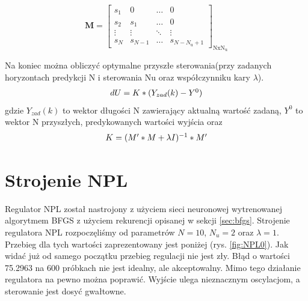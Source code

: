 		\begin{equation}
		\boldsymbol{M}=\left[
		\begin{array}
		{cccc}
		s_{1} & 0 & \ldots & 0\\
		s_{2} & s_{1} & \ldots & 0\\
		\vdots & \vdots & \ddots & \vdots\\
		s_{N} & s_{N-1} & \ldots &  s_{N-N_{\mathrm{u}}+1}
		\end{array}
		\right]_{\mathrm{NxN_u}}
		\label{Mm}
		\end{equation}
		
		Na koniec można obliczyć optymalne przyszłe sterowania(przy zadanych horyzontach predykcji N i sterowania Nu oraz współczynniku kary $\lambda$). 
		\begin{equation}
		\begin{tabular}{l}
		$dU=K*(Y_{zad}(k)-Y^0)$
		\end{tabular}
		\label{eq:NPL_du}
		\end{equation}
		gdzie $Y_{zad}(k)$ to wektor długości N zawierający aktualną wartość zadaną, $Y^0$ to wektor N przyszłych, predykowanych wartości wyjścia oraz
		\begin{equation}
		\begin{tabular}{l}
		$K=(M'*M+\lambda I)^{-1}*M'$
		\end{tabular}
		\label{eq:NPL_K}
		\end{equation}
	
		
		
	\section{Strojenie NPL}
		\label{sec:stroj_NPL}
		Regulator NPL został nastrojony z użyciem sieci neuronowej wytrenowanej algorytmem BFGS z użyciem rekurencji opisanej w sekcji \ref{sec:bfgs}. Strojenie regulatora NPL rozpoczęliśmy od parametrów $N=10$, $N_u=2$ oraz $\lambda=1$. Przebieg dla tych wartości zaprezentowany jest poniżej (rys. \ref{fig:NPL0}). Jak widać już od samego początku przebieg regulacji nie jest zły. Błąd o wartości 75.2963 na 600 próbkach nie jest idealny, ale akceptowalny. Mimo tego działanie regulatora na pewno można poprawić. Wyjście ulega nieznacznym oscylacjom, a sterowanie jest dosyć gwałtowne.
		

